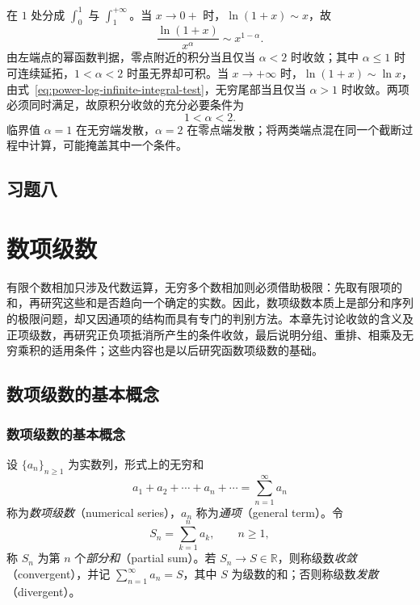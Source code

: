 \documentclass[UTF8,12pt,a4paper,fontset=fandol]{ctexbook}
\begin{document}
\begin{solve}
在 $1$ 处分成 $\int_0^1$ 与 $\int_1^{+\infty}$。当 $x\to0+$ 时，$\ln(1+x)\sim x$，故
\[
    \frac{\ln(1+x)}{x^\alpha}\sim x^{1-\alpha}.
\]
由左端点的幂函数判据，零点附近的积分当且仅当 $\alpha<2$ 时收敛；其中 $\alpha\leq1$ 时可连续延拓，$1<\alpha<2$ 时虽无界却可积。当 $x\to+\infty$ 时，$\ln(1+x)\sim\ln x$，由式~\eqref{eq:power-log-infinite-integral-test}，无穷尾部当且仅当 $\alpha>1$ 时收敛。两项必须同时满足，故原积分收敛的充分必要条件为
\[
    1<\alpha<2.
\]
临界值 $\alpha=1$ 在无穷端发散，$\alpha=2$ 在零点端发散；将两类端点混在同一个截断过程中计算，可能掩盖其中一个条件。
\end{solve}

\section*{习题八}

\chapter{数项级数}
\label{chap:numerical-series}

有限个数相加只涉及代数运算，无穷多个数相加则必须借助极限：先取有限项的和，再研究这些和是否趋向一个确定的实数。因此，数项级数本质上是部分和序列的极限问题，却又因通项的结构而具有专门的判别方法。本章先讨论收敛的含义及正项级数，再研究正负项抵消所产生的条件收敛，最后说明分组、重排、相乘及无穷乘积的适用条件；这些内容也是以后研究函数项级数的基础。

\section{数项级数的基本概念}
\label{sec:basic-concepts-of-numerical-series}

\subsection{数项级数的基本概念}
\label{subsec:basic-concepts-of-numerical-series}

\begin{definition}
设 $\{a_n\}_{n\geq1}$ 为实数列，形式上的无穷和
\[
    a_1+a_2+\cdots+a_n+\cdots=\sum_{n=1}^{\infty}a_n
\]
称为\emph{数项级数}（numerical series），$a_n$ 称为\emph{通项}（general term）。令
\begin{equation}
    S_n=\sum_{k=1}^n a_k,\qquad n\geq1,
    \label{eq:numerical-series-partial-sums}
\end{equation}
称 $S_n$ 为第 $n$ 个\emph{部分和}（partial sum）。若 $S_n\to S\in\mathbb R$，则称级数\emph{收敛}（convergent），并记 $\sum_{n=1}^{\infty}a_n=S$，其中 $S$ 为级数的和；否则称级数\emph{发散}（divergent）。
\end{definition}
\end{document}
